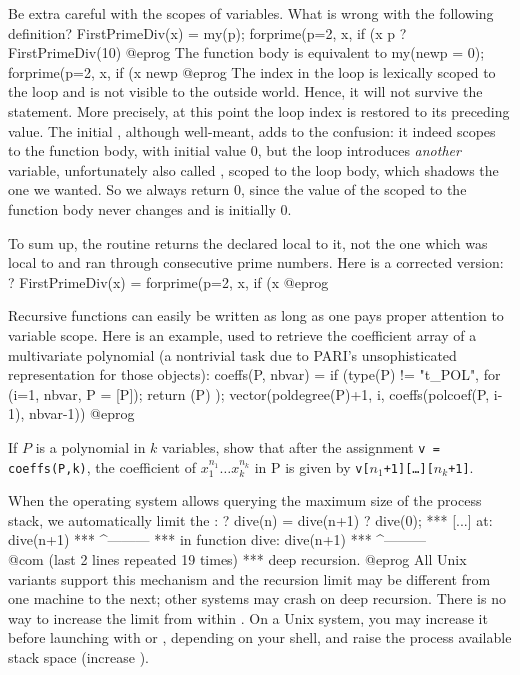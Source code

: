 \label{se:bewarescope}
Be extra careful with the scopes of variables. What is wrong with the
following definition?
\bprog
FirstPrimeDiv(x) =
{ my(p);
  forprime(p=2, x, if (x%
  p
}
? FirstPrimeDiv(10)
@eprog\noindent {} The function body is equivalent to
\bprog
{ my(newp = 0);
  forprime(p=2, x, if (x%
  newp
}
@eprog\noindent
{} The index  in the 
loop is lexically scoped to the loop and is not visible to the outside world.
Hence, it will not survive the  statement. More precisely, at this
point the loop index is restored to its preceding value. The initial
, although well-meant, adds to the confusion: it indeed scopes
 to the function body, with initial value $0$, but the 
loop introduces \emph{another} variable, unfortunately also called ,
scoped to the loop body, which shadows the one we wanted. So we always return
$0$, since the value of the  scoped to the function body never changes
and is initially $0$.

To sum up, the routine returns the  declared local to
it, not the one which was local to  and ran through consecutive
prime numbers. Here is a corrected version:
\bprog
? FirstPrimeDiv(x) = forprime(p=2, x, if (x%
@eprog

 Recursive functions can easily
be written as long as one pays proper attention to variable scope. Here is an
example, used to retrieve the coefficient array of a multivariate polynomial
(a nontrivial task due to PARI's unsophisticated representation for those
objects): 
\bprog
coeffs(P, nbvar) =
{
  if (type(P) != "t_POL",
    for (i=1, nbvar, P = [P]);
    return (P)
  );
  vector(poldegree(P)+1, i, coeffs(polcoef(P, i-1), nbvar-1))
}
@eprog

\noindent If $P$ is a polynomial in $k$ variables, show that after the
assignment {\tt v = coeffs(P,k)}, the coefficient of $x_1^{n_1}\dots
x_k^{n_k}$ in P is given by {\tt v[$n_1$+1][\dots][$n_k$+1]}.

When the operating system allows querying the maximum size of the process
stack, we automatically limit the : 
\bprog
? dive(n) = dive(n+1)
? dive(0);
  ***   [...] at: dive(n+1)
  ***             ^---------
  ***   in function dive: dive(n+1)
  ***                     ^---------
  \\@com (last 2 lines repeated 19 times)
  ***   deep recursion.
@eprog\noindent
All Unix variants support this mechanism and the recursion limit
may be different from one machine to the next; other systems may crash on
deep recursion. There is no way to increase the limit from within .
On a Unix system, you may increase it before launching  with
 or , depending on your shell, and raise the process
available stack space (increase ).

